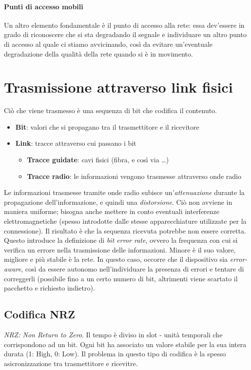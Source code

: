 \paragraph{Punti di accesso mobili}
Un altro elemento fondamentale è il punto di accesso alla rete: essa dev'essere in grado di riconoscere che si sta degradando il segnale e individuare un altro punto di accesso al quale ci stiamo avvicinando, così da evitare un'eventuale degradazione della qualità della rete quando si è in movimento.

\section{Trasmissione attraverso link fisici}
Ciò che viene trasmesso è una sequenza di bit che codifica il contenuto.
\begin{itemize}
	\item \textbf{Bit}: valori che si propagano tra il trasmettitore e il ricevitore
	\item \textbf{Link}: tracce attraverso cui passano i bit
	\begin{itemize}
		\item \textbf{Tracce guidate}: cavi fisici (fibra, e così via \ldots)
		\item \textbf{Tracce radio}: le informazioni vengono trasmesse attraverso onde radio
	\end{itemize}
\end{itemize}

Le informazioni trasmesse tramite onde radio subisce un'\textit{attenuazione} durante la propagazione dell'informazione, e quindi una \textit{distorsione}.
Ciò non avviene in maniera uniforme; bisogna anche mettere in conto eventuali interferenze elettromagnetiche (spesso introdotte dalle stesse apparecchiature utilizzate per la connessione). Il risultato è che la sequenza ricevuta potrebbe non essere corretta. Questo introduce la definizione di \textit{bit error rate}, ovvero la frequenza con cui si verifica un errore nella trasmissione delle informazioni. Minore è il suo valore, migliore e più stabile è la rete.
In questo caso, occorre che il dispositivo sia \textit{error-aware}, così da essere autonomo nell'individuare la presenza di errori e tentare di correggerli (possibile fino a un certo numero di bit, altrimenti viene scartato il pacchetto e richiesto indietro).

\subsection{Codifica NRZ}
\textit{NRZ: Non Return to Zero}. Il tempo è diviso in slot - unità temporali che corrispondono ad un bit.
Ogni bit ha associato un valore stabile per la sua intera durata (1: High, 0: Low).
Il problema in questo tipo di codifica è la spesso asicronizzazione tra trasmettitore e ricevitre.

